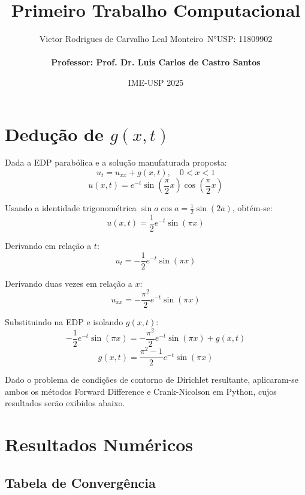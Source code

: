 \documentclass[a4paper, 12pt]{article}
\title{Primeiro Trabalho Computacional}
\author{
    Victor Rodrigues de Carvalho Leal Monteiro\
    N°USP: 11809902 \\
    \\
    {\textbf{Professor: Prof. Dr. Luis Carlos de Castro Santos}}}
\date{IME-USP 2025}
\begin{document}
    \maketitle


    \section*{Dedução de \( g(x,t) \)}

    Dada a EDP parabólica e a solução manufaturada proposta:
    \[
        u_t = u_{xx} + g(x,t), \quad 0 < x < 1
    \]
    \[
        u(x,t) = e^{-t} \sin\left( \frac{\pi}{2} x \right) \cos\left( \frac{\pi}{2} x \right)
    \]

    Usando a identidade trigonométrica \(\sin a \cos a = \frac{1}{2}\sin(2a)\), obtém-se:
    \[
        u(x,t) = \frac{1}{2} e^{-t} \sin(\pi x)
    \]

    Derivando em relação a \(t\):
    \[
        u_t = -\frac{1}{2} e^{-t} \sin(\pi x)
    \]

    Derivando duas vezes em relação a \(x\):
    \[
        u_{xx} = -\frac{\pi^2}{2} e^{-t} \sin(\pi x)
    \]

    Substituindo na EDP e isolando \(g(x,t)\):
    \[
        -\frac{1}{2} e^{-t} \sin(\pi x) = -\frac{\pi^2}{2} e^{-t} \sin(\pi x) + g(x,t)
    \]
    \[
        \boxed{g(x,t) = \frac{\pi^2 - 1}{2} e^{-t} \sin(\pi x)}
    \]

    Dado o problema de condições de contorno de Dirichlet resultante, aplicaram-se ambos os métodos Forward Difference e Crank-Nicolson em Python, cujos resultados serão exibidos abaixo.

    \pagebreak


    \section{Resultados Numéricos}

    \subsection{Tabela de Convergência}
\end{document}
